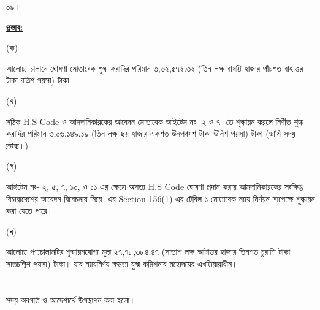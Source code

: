 \documentclass[12pt]{article}
\begin{document}
\begin{minipage}[t]{0.05\linewidth}
০৯।
\end{minipage}
\begin{minipage}[t]{0.95\linewidth}
\underline{\textbf{প্রস্তাব:}}
\end{minipage}
\begin{minipage}[t]{0.05\linewidth}
\hspace{1em}
\end{minipage}
\begin{minipage}[t]{0.05\linewidth}
(ক)
\end{minipage}
\begin{minipage}[t]{0.90\linewidth}
আলোচ্য চালানে ঘোষণা মোতাবেক শুল্ক করাদির পরিমান
৩,৬২,৫৭২.৩২ (তিন লক্ষ বাষট্টি হাজার পাঁচশত বাহাত্তর টাকা বত্রিশ পয়সা) টাকা
\\
\end{minipage}
\begin{minipage}[t]{0.05\linewidth}
\hspace{1em}
\end{minipage}
\begin{minipage}[t]{0.05\linewidth}
(খ)
\end{minipage}
\begin{minipage}[t]{0.90\linewidth}
সঠিক H.S Code ও আমদানিকারকের আবেদন
মোতাবেক আইটেম নং- ২ ও ৭ {\cpcofs} -তে
শুল্কায়ন করলে নির্ণীত শুল্ক করাদির পরিমান
৩,০৬,১৪৯.১৯ (তিন লক্ষ ছয় হাজার একশত ঊনপঞ্চাশ টাকা ঊনিশ পয়সা) টাকা (ডামি সদয় দ্রষ্টব্য।)।
\\
\end{minipage}
\begin{minipage}[t]{0.05\linewidth}
\hspace{1em}
\end{minipage}
\begin{minipage}[t]{0.05\linewidth}
(গ)
\end{minipage}
\begin{minipage}[t]{0.90\linewidth}
আইটেম নং-  ২, ৫, ৭, ১০, ও ১১ এর
ক্ষেত্রে অসত্য H.S Code ঘোষণা প্রদান করায়
আমদানিকারকের সংক্ষিপ্ত বিচারাদেশের আবেদন
বিবেচনায় নিয়ে {\tca} -এর Section-156(1) এর
টেবিল-১ মোতাবেক ন্যায় নির্ণয়ন সাপেক্ষে শুল্কায়ন করা
যেতে পারে।
\\
\end{minipage}
\begin{minipage}[t]{0.05\linewidth}
\hspace{1em}
\end{minipage}
\begin{minipage}[t]{0.05\linewidth}
(ঘ)
\end{minipage}
\begin{minipage}[t]{0.90\linewidth}
আলোচ্য পণ্যচালানটির শুল্কায়নযোগ্য মূল্য ২৭,৭৮,৩৮৪.৪৭ (সাতাশ লক্ষ আটাত্তর হাজার তিনশত চুরাশি টাকা সাতচল্লিশ পয়সা) টাকা। যার ন্যায়নির্ণয় ক্ষমতা যুগ্ম কমিশনার মহোদয়ের এখতিয়ারাধীন।
\\
\\
\\
\normalsize
সদয় অবগতি ও আদেশার্থে উপস্থাপন করা
হলো।
\end{minipage}
\end{document}
